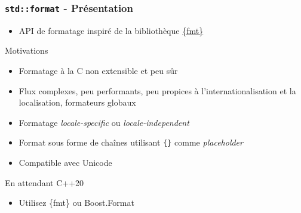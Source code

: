 \documentclass[C++.tex]{subfiles}
\begin{document}
\begin{frame}[fragile]
	\frametitle{\lstinline|std::format| - Présentation}
	\begin{itemize}
		\item API de formatage inspiré de la bibliothèque \href{https://github.com/fmtlib/fmt}{\{fmt\}}
	\end{itemize}
		
	\begin{block}{Motivations}
		\begin{itemize}
			\item Formatage \og à la C\fg{} non extensible et peu sûr


			\item Flux complexes, peu performants, peu propices à l'internationalisation et la localisation, formateurs globaux

		\end{itemize}
	\end{block}

	\begin{itemize}
		\item Formatage \textit{locale-specific} ou \textit{locale-independent}


		\item Format sous forme de chaînes utilisant \lstinline|{}| comme \textit{placeholder}
		\item Compatible avec Unicode
	\end{itemize}

	\begin{block}{En attendant C++20}
		\begin{itemize}
			\item Utilisez \{fmt\} ou Boost.Format
		\end{itemize}
	\end{block}
\end{frame}
\end{document}
